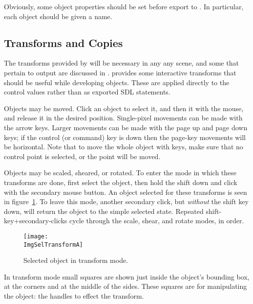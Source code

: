 		Obviously, some object properties should be set
		before export to . In particular, each
		object should be given a name.

		\subsection{\dtypkghdr{} Transforms and Copies}%
		\label{ssec:epspline_transforms}
		The transforms provided by \IXpov{} 
		will be necessary in any any scene, and some
		that pertain to \IXpkg{} output are
		discussed in .
		\IXpkgu{} provides some interactive transforms
		that should be useful while developing objects.
		These are applied directly to the control 
		values rather than as exported SDL statements.
		
		Objects may be moved. Click an object to select it,
		and then  it with the mouse, and
		release it in the desired position. Single-pixel
		movements can be made with the arrow keys. Larger
		movements can be made with the page up and page down
		keys; if the control (or command) key is down then
		the page-key movements will be horizontal. Note that
		to move the whole object with keys, make sure that
		no control point is selected, or the point will be
		moved.
		
		Objects may be scaled, sheared, or rotated.
		To enter the mode in which these transforms are
		done, first select the object, then hold the
		shift  down and click with the secondary
		mouse button. An object selected for these
		transforms is seen in figure~\ref{fig:sel_for_trans_a}.
		To leave this mode, another secondary click, but
		\emph{without} the shift key down, will return
		the object to the simple selected state.
		Repeated shift-key+secondary-clicks
		cycle through the scale, shear, and rotate modes,
		in order.

		\begin{figure}[htb!]
		\centering
		\texttt{[image: \\ImgSelTransformA]}
		\caption{Selected object in transform mode.}
		\label{fig:sel_for_trans_a}
		\end{figure}
		
		In transform mode small squares are
		shown just inside the object's bounding box, at the
		corners and at the middle of the sides. These
		squares are  for manipulating
		the object:  the handles to effect the
		transform.
		
